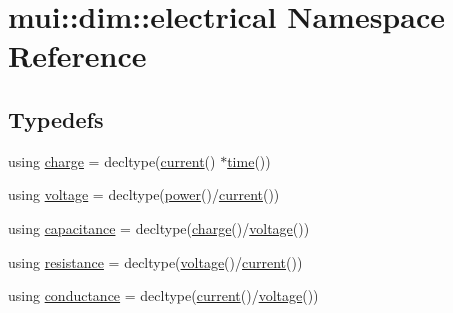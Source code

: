 \hypertarget{namespacemui_1_1dim_1_1electrical}{}\section{mui\+:\+:dim\+:\+:electrical Namespace Reference}
\label{namespacemui_1_1dim_1_1electrical}
\subsection*{Typedefs}
\begin{DoxyCompactItemize}
\item 
using \hyperlink{namespacemui_1_1dim_1_1electrical_acd4b8cce75196ce05ff2879941d870df}{charge} = decltype(\hyperlink{namespacemui_1_1dim_ac15a72100f3e57d6c9419fca5501b456}{current}() $\ast$\hyperlink{namespacemui_1_1dim_a3d3a0014025f1c2c0dd7418791928500}{time}())
\item 
using \hyperlink{namespacemui_1_1dim_1_1electrical_a028fd928ac1e20226332a4e793bac739}{voltage} = decltype(\hyperlink{namespacemui_1_1dim_a055b2b3b59399dc93eeb974aef05b85b}{power}()/\hyperlink{namespacemui_1_1dim_ac15a72100f3e57d6c9419fca5501b456}{current}())
\item 
using \hyperlink{namespacemui_1_1dim_1_1electrical_ab6fce13543150792566ab8449ce7ef0e}{capacitance} = decltype(\hyperlink{namespacemui_1_1dim_1_1electrical_acd4b8cce75196ce05ff2879941d870df}{charge}()/\hyperlink{namespacemui_1_1dim_1_1electrical_a028fd928ac1e20226332a4e793bac739}{voltage}())
\item 
using \hyperlink{namespacemui_1_1dim_1_1electrical_a86a4b6ba2ef40975afac4dd629e07d3b}{resistance} = decltype(\hyperlink{namespacemui_1_1dim_1_1electrical_a028fd928ac1e20226332a4e793bac739}{voltage}()/\hyperlink{namespacemui_1_1dim_ac15a72100f3e57d6c9419fca5501b456}{current}())
\item 
using \hyperlink{namespacemui_1_1dim_1_1electrical_a575b190ccda32c3b901b8fd44249c62e}{conductance} = decltype(\hyperlink{namespacemui_1_1dim_ac15a72100f3e57d6c9419fca5501b456}{current}()/\hyperlink{namespacemui_1_1dim_1_1electrical_a028fd928ac1e20226332a4e793bac739}{voltage}())
\end{DoxyCompactItemize}
